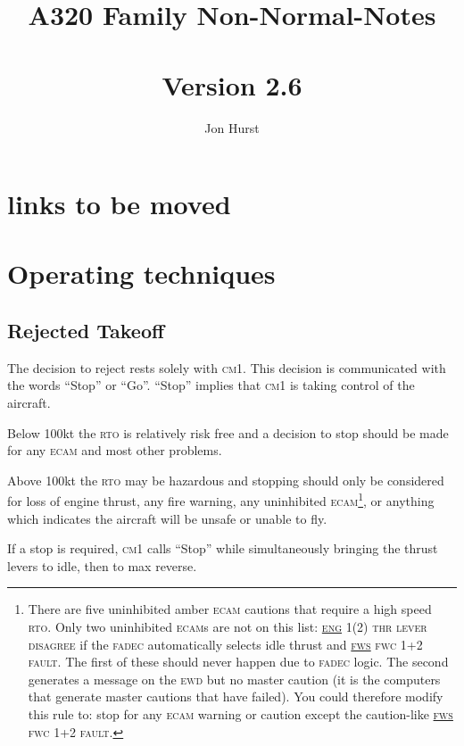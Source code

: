 \documentclass[a5paper,11pt,twoside]{book}
\title{A320 Family Non-Normal-Notes\\~\\\large{Version 2.6}}
\author{Jon Hurst}
\date{}
\newcommand{\ac}[1]{{\scshape\MakeLowercase{#1}}}
\newcommand{\ecam}[2]{{\ac{\uline{#1} #2}}}
\begin{document}
\frontmatter
\maketitle

\ifdefined\HCode
\else
\tableofcontents
\fi

\chapter{links to be moved}
\label{sec-loss-of-braking}
\label{sec-all-engine-failure}
\label{sec-gravity-fuel-feeding}
\label{sec-nose-wheel-steering}

\mainmatter

\chapter{Operating techniques}
\section{Rejected Takeoff}
The decision to reject rests solely with \ac{CM}1. This decision is communicated
with the words ``Stop'' or “Go''. ``Stop'' implies that \ac{CM}1 is taking
control of the aircraft.

Below 100kt the \ac{RTO} is relatively risk free and a decision to stop should
be made for any \ac{ECAM} and most other problems.

Above 100kt the \ac{RTO} may be hazardous and stopping should only be considered
for loss of engine thrust, any fire warning, any uninhibited
\ac{ECAM}\footnote{There are five uninhibited amber \ac{ECAM} cautions that
require a high speed \ac{RTO}. Only two uninhibited \ac{ECAM}s are not on this
list: \ecam{ENG}{1(2) THR LEVER DISAGREE} if the \ac{FADEC} automatically
selects idle thrust and \ecam{FWS}{FWC 1+2 FAULT}. The first of these should
never happen due to \ac{FADEC} logic. The second generates a message on the
\ac{EWD} but no master caution (it is the computers that generate master
cautions that have failed). You could therefore modify this rule to: stop for
any \ac{ECAM} warning or caution except the caution-like \ecam{FWS}{FWC 1+2
  FAULT}.}, or anything which indicates the aircraft will be unsafe or unable to
fly.

If a stop is required, \ac{CM}1 calls ``Stop'' while simultaneously bringing the
thrust levers to idle, then to max reverse.
\end{document}
